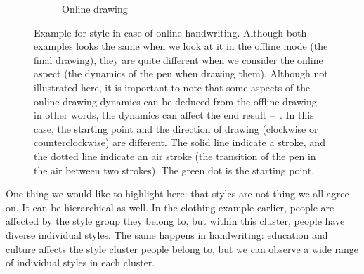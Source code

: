 \begin{figure}[!htbp]
    \begin{subfigure}[tb]{0.45\textwidth}
        \caption{Online drawing}
    \end{subfigure}
    \caption{Example for style in case of online handwriting. Although both examples looks the same when we look at it in the offline mode (the final drawing), they are quite different when we consider the online aspect (the dynamics of the pen when drawing them). Although not illustrated here, it is important to note that some aspects of the online drawing dynamics can be deduced from the offline drawing -- in other words, the dynamics can affect the end result --~\citep{diaz2017recovering}. In this case, the starting point and the direction of drawing (clockwise or counterclockwise) are different. The solid line indicate a stroke, and the dotted line indicate an air stroke (the transition of the pen in the air between two strokes). The green dot is the starting point.}
    \label{fig:online_handwriting_styles}
  \end{figure}

  \par One thing we would like to highlight here: that styles are not thing we all agree on. It can be hierarchical as well. In the clothing example earlier, people are affected by the style group they belong to, but within this cluster, people have diverse individual styles. The same happens in handwriting: education and culture affects the style cluster people belong to, but we can observe a wide range of individual styles in each cluster.

